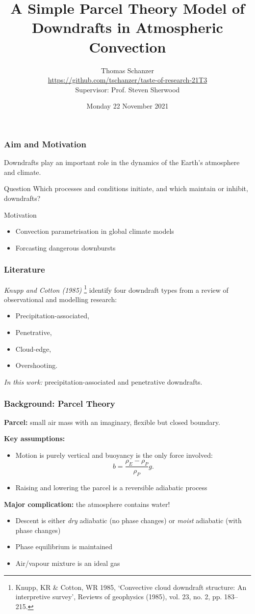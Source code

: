 \documentclass[handout]{beamer}
\title{A Simple Parcel Theory Model of Downdrafts in Atmospheric Convection}
\author{
    Thomas Schanzer
    \texorpdfstring{\\}{}
    \small \texorpdfstring{
        \url{https://github.com/tschanzer/taste-of-research-21T3}}{
        https://github.com/tschanzer/taste-of-research-21T3
    }
    \texorpdfstring{\\ \vspace{5mm}}{}
    Supervisor: Prof. Steven Sherwood}
\institute{UNSW School of Physics}
\date{Monday 22 November 2021}
\begin{document}
\frame{\titlepage}

\begin{frame}
    \frametitle{Aim and Motivation}
    Downdrafts play an important role in the dynamics of the Earth's
    atmosphere and climate.
    \begin{block}{Question}
        Which processes and conditions initiate, and which
        maintain or inhibit, downdrafts?
    \end{block}
    \begin{block}{Motivation}
        \begin{itemize}
            \item Convection parametrisation in global climate models
            \item Forcasting dangerous downbursts
        \end{itemize}
    \end{block}
\end{frame}

\begin{frame}
    \frametitle{Literature}
    \emph{Knupp and Cotton (1985)}
    \footnote{ \tiny
        Knupp, KR \& Cotton, WR 1985, ‘Convective cloud downdraft
        structure: An interpretive survey’, Reviews of geophysics (1985),
        vol. 23, no. 2, pp. 183–215.}
    identify four downdraft types from a review of observational and
    modelling research:
    \begin{itemize}
        \item<1,5> Precipitation-associated, \pause
        \item<2,6> Penetrative, \pause
        \item<3> Cloud-edge, \pause
        \item<4> Overshooting. \pause
    \end{itemize}
    \emph{In this work:} precipitation-associated and penetrative
    downdrafts.
\end{frame}

\begin{frame}
    \frametitle{Background: Parcel Theory}
    \textbf{Parcel:} small air mass with an imaginary, flexible but closed
    boundary.

    \textbf{Key assumptions:}
    \begin{itemize}
        \item Motion is purely vertical and buoyancy is the only force
            involved: \[b = \frac{\rho_E - \rho_P}{\rho_P} g.\]
        \item Raising and lowering the parcel is a reversible adiabatic
            process
    \end{itemize}

    \textbf{Major complication:} the atmosphere contains water!
    \begin{itemize}
        \item Descent is either \emph{dry} adiabatic (no phase changes) or
            \emph{moist} adiabatic (with phase changes)
        \item Phase equilibrium is maintained
        \item Air/vapour mixture is an ideal gas
    \end{itemize}
\end{frame}
\end{document}
